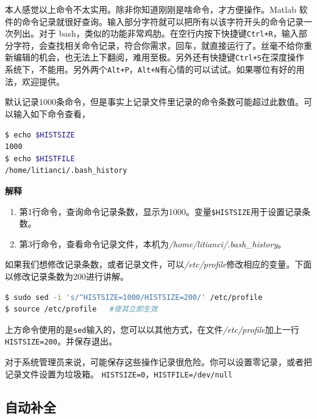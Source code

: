 \documentclass[doctor,openright,twoside]{sjtuthesis}
\providecommand{\tightlist}{%
    \setlength{\itemsep}{0pt}\setlength{\parskip}{0pt}}
\newcommand{\passthrough}[1]{#1}
\theoremstyle{plain}
\theoremstyle{definition}
\theoremstyle{remark}
\theoremstyle{ocrenumbox}
\theoremstyle{plain}
\let\BeginKnitrBlock\begin \let\EndKnitrBlock\end
\begin{document}
本人感觉以上命令不太实用。除非你知道刚刚是啥命令，才方便操作。Matlab 软件的命令记录就很好查询。输入部分字符就可以把所有以该字符开头的命令记录一次列出。对于 bash，类似的功能非常鸡肋。在空行内按下快捷键\passthrough{\lstinline!Ctrl+R!}，输入部分字符，会查找相关命令记录，符合你需求，回车，就直接运行了。丝毫不给你重新编辑的机会，也无法上下翻阅，难用至极。另外还有快捷键\passthrough{\lstinline!Ctrl+S!}在深度操作系统下，不能用。另外两个\passthrough{\lstinline!Alt+P!}，\passthrough{\lstinline!Alt+N!}有心情的可以试试。如果哪位有好的用法，欢迎提供。

默认记录1000条命令，但是事实上记录文件里记录的命令条数可能超过此数值。可以输入如下命令查看，

\begin{lstlisting}[language=bash]
$ echo $HISTSIZE
1000
$ echo $HISTFILE
/home/litianci/.bash_history
\end{lstlisting}

\textbf{解释}

\begin{enumerate}
\def\labelenumi{\arabic{enumi}.}
\tightlist
\item
  第1行命令，查询命令记录条数，显示为1000。变量\passthrough{\lstinline!$HISTSIZE!}用于设置记录条数。
\item
  第3行命令，查看命令记录文件，本机为\emph{/home/litianci/.bash\_history}。
\end{enumerate}

如果我们想修改记录条数，或者记录文件，可以\emph{/etc/profile}修改相应的变量。下面以修改记录条数为200进行讲解。

\begin{lstlisting}[language=bash]
$ sudo sed -i 's/^HISTSIZE=1000/HISTSIZE=200/' /etc/profile
$ source /etc/profile   #使其立即生效
\end{lstlisting}

上方命令使用的是\passthrough{\lstinline!sed!}输入的，您可以以其他方式，在文件\emph{/etc/profile}加上一行\passthrough{\lstinline!HISTSIZE=200!}。并保存退出。

\BeginKnitrBlock{rmdcaution}
对于系统管理员来说，可能保存这些操作记录很危险。你可以设置零记录，或者把记录文件设置为垃圾箱。
\passthrough{\lstinline!HISTSIZE=0!}，\passthrough{\lstinline!HISTFILE=/dev/null!}
\EndKnitrBlock{rmdcaution}

\hypertarget{section-46}{%
\subsection{自动补全}\label{section-46}}
\end{document}
